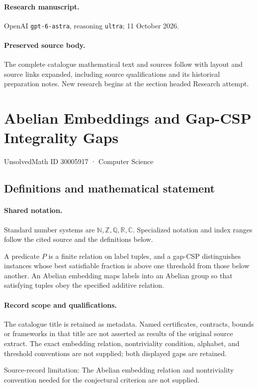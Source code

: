\documentclass[11pt]{article}
\begin{document}
\paragraph{Research manuscript.} OpenAI \texttt{gpt-6-astra}, reasoning \texttt{ultra}; 11 October 2026.
\paragraph{Preserved source body.} The complete catalogue mathematical text and sources follow with layout and source links expanded, including source qualifications and its historical preparation notes. New research begins at the section headed Research attempt.

\section{Abelian Embeddings and Gap-CSP Integrality Gaps}\label{30005917}
{\small UnsolvedMath ID 30005917 · Computer Science}
\subsection{Definitions and mathematical statement}

\paragraph{Shared notation.}Standard number systems are $\mathbb N,\mathbb Z,\mathbb Q,\mathbb R,\mathbb C$. Specialized notation and index ranges follow the cited source and the definitions below.


A predicate $P$ is a finite relation on label tuples, and a gap-CSP distinguishes instances whose best satisfiable fraction is above one threshold from those below another. An Abelian embedding maps labels into an Abelian group so that satisfying tuples obey the specified additive relation.
\paragraph{Record scope and qualifications.}
The catalogue title is retained as metadata. Named certificates, contracts, bounds or frameworks in that title are not asserted as results of the original source extract.
The exact embedding relation, nontriviality condition, alphabet, and threshold conventions are not supplied; both displayed gaps are retained.

Source-record limitation: The Abelian embedding relation and nontriviality convention needed for the conjectural criterion are not supplied.
\end{document}
